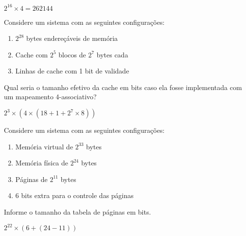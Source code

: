 \documentclass{article}
\begin{document}
$2^{16} \times 4 = 262144$

Considere um sistema com as seguintes configurações:

\begin{enumerate}
\item $2^{28}$ bytes endereçáveis de memória
\item Cache com $2^{5}$ blocos de $2^{7}$ bytes cada
\item Linhas de cache com 1 bit de validade
\end{enumerate}

Qual seria o tamanho efetivo da cache em bits caso ela fosse implementada com
um mapeamento 4-associativo?

$2^{3}\times(4\times(18+1+2^{7}\times8))$

Considere um sistema com as seguintes configurações:

\begin{enumerate}
\item Memória virtual de $2^{33}$ bytes
\item Memória física de $2^{24}$ bytes
\item Páginas de $2^{11}$ bytes
\item 6 bits extra para o controle das páginas
\end{enumerate}

Informe o tamanho da tabela de páginas em bits.

$2^{22}\times(6+(24-11))$
\end{document}
